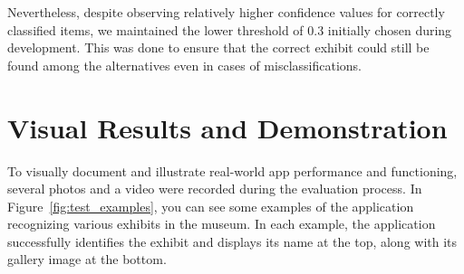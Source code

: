 Nevertheless, despite observing relatively higher confidence values for correctly classified items, we maintained the lower threshold of 0.3 initially chosen during development. This was done to ensure that the correct exhibit could still be found among the alternatives even in cases of misclassifications.

\section{Visual Results and Demonstration}

To visually document and illustrate real-world app performance and functioning, several photos and a video were recorded during the evaluation process. In Figure~\ref{fig:test_examples}, you can see some examples of the application recognizing various exhibits in the museum. In each example, the application successfully identifies the exhibit and displays its name at the top, along with its gallery image at the bottom.

